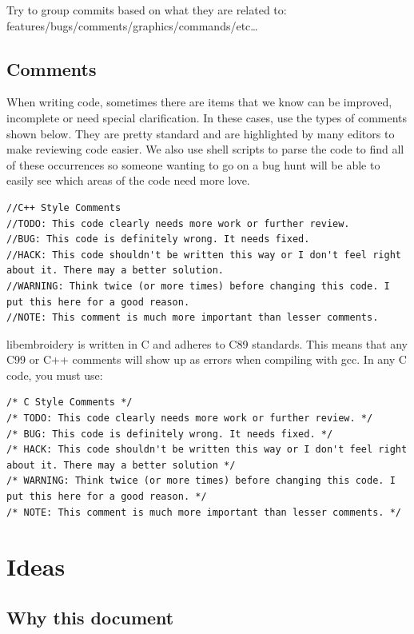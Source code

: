 \documentclass[a4paper, 11pt]{report}
\begin{document}
Try to group commits based on what they are related to:
features/bugs/comments/graphics/commands/etc\ldots{}

\hypertarget{comments}{%
\subsection{Comments}\label{comments}}

When writing code, sometimes there are items that we know can be
improved, incomplete or need special clarification. In these cases, use
the types of comments shown below. They are pretty standard and are
highlighted by many editors to make reviewing code easier. We also use
shell scripts to parse the code to find all of these occurrences so
someone wanting to go on a bug hunt will be able to easily see which
areas of the code need more love.

\begin{verbatim}
//C++ Style Comments
//TODO: This code clearly needs more work or further review.
//BUG: This code is definitely wrong. It needs fixed.
//HACK: This code shouldn't be written this way or I don't feel right about it. There may a better solution.
//WARNING: Think twice (or more times) before changing this code. I put this here for a good reason.
//NOTE: This comment is much more important than lesser comments.
\end{verbatim}

libembroidery is written in C and adheres to C89 standards. This means
that any C99 or C++ comments will show up as errors when compiling with
gcc. In any C code, you must use:

\begin{verbatim}
/* C Style Comments */
/* TODO: This code clearly needs more work or further review. */
/* BUG: This code is definitely wrong. It needs fixed. */
/* HACK: This code shouldn't be written this way or I don't feel right about it. There may a better solution */
/* WARNING: Think twice (or more times) before changing this code. I put this here for a good reason. */
/* NOTE: This comment is much more important than lesser comments. */
\end{verbatim}

\hypertarget{ideas-1}{%
\section{Ideas}\label{ideas-1}}

\hypertarget{why-this-document-1}{%
\subsection{Why this document}\label{why-this-document-1}}
\end{document}
